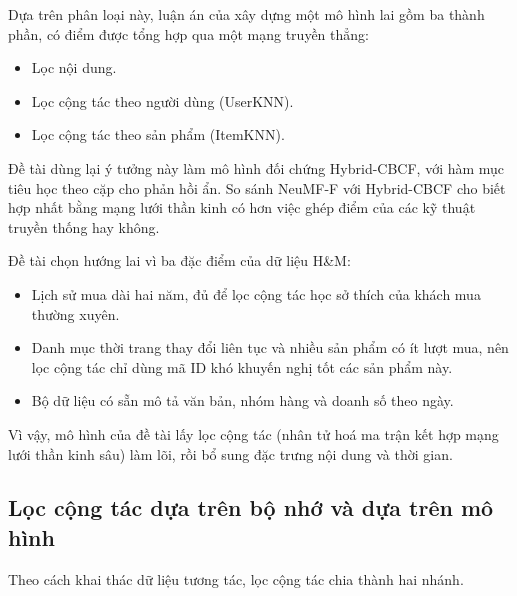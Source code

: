 Dựa trên phân loại này, luận án của \textcite{holinh2023multisource} xây dựng một mô hình lai gồm ba thành phần, có điểm được tổng hợp qua một mạng truyền thẳng:
\begin{itemize}
    \item Lọc nội dung.
    \item Lọc cộng tác theo người dùng (UserKNN).
    \item Lọc cộng tác theo sản phẩm (ItemKNN).
\end{itemize}

Đề tài dùng lại ý tưởng này làm mô hình đối chứng Hybrid-CBCF, với hàm mục tiêu học theo cặp cho phản hồi ẩn. So sánh NeuMF-F với Hybrid-CBCF cho biết hợp nhất bằng mạng lưới thần kinh có hơn việc ghép điểm của các kỹ thuật truyền thống hay không.

Đề tài chọn hướng lai vì ba đặc điểm của dữ liệu H\&M:
\begin{itemize}
    \item Lịch sử mua dài hai năm, đủ để lọc cộng tác học sở thích của khách mua thường xuyên.
    \item Danh mục thời trang thay đổi liên tục và nhiều sản phẩm có ít lượt mua, nên lọc cộng tác chỉ dùng mã ID khó khuyến nghị tốt các sản phẩm này.
    \item Bộ dữ liệu có sẵn mô tả văn bản, nhóm hàng và doanh số theo ngày.
\end{itemize}

Vì vậy, mô hình của đề tài lấy lọc cộng tác (nhân tử hoá ma trận kết hợp mạng lưới thần kinh sâu) làm lõi, rồi bổ sung đặc trưng nội dung và thời gian.

\subsection{Lọc cộng tác dựa trên bộ nhớ và dựa trên mô hình}
\label{subsec:memory_model_based}

Theo cách khai thác dữ liệu tương tác, lọc cộng tác chia thành hai nhánh.

